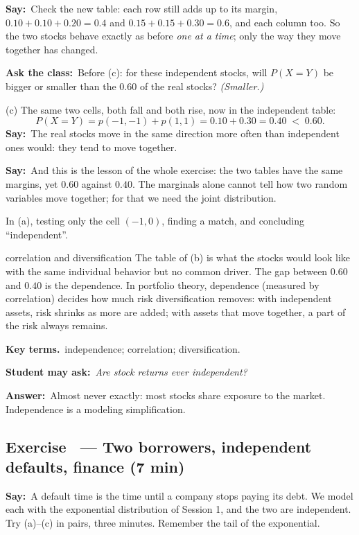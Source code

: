 \documentclass[11pt,a4paper,parskip=half]{scrartcl}
\renewcommand{\needspace}[1]{\Needspace{6\baselineskip}}
\newcommand{\terms}{\par\textbf{\color{plum}Key terms.}\ }
\newcommand{\sq}[1]{\par\textbf{\color{plum}Student may ask:}\ \emph{#1}\par}
\newcommand{\ans}{\textbf{Answer:}\ }
\newcommand{\say}{\textbf{\color{teal}Say:}\ }
\newcommand{\ask}{\textbf{\color{navy}Ask the class:}\ }
\begin{document}
\say Check the new table: each row still adds up to its margin,
$0.10+0.10+0.20=0.4$ and $0.15+0.15+0.30=0.6$, and each column too. So the
two stocks behave exactly as before \emph{one at a time}; only the way
they move together has changed.

\ask Before (c): for these independent stocks, will $P(X=Y)$ be bigger or
smaller than the $0.60$ of the real stocks? \emph{(Smaller.)}

(c) The same two cells, both fall and both rise, now in the independent
table:
\[ P(X=Y)=p(-1,-1)+p(1,1)=0.10+0.30=0.40\;<\;0.60. \]
\say The real stocks move in the same direction more often than
independent ones would: they tend to move together.

\say And this is the lesson of the whole exercise: the two tables have the
same margins, yet $0.60$ against $0.40$. The marginals alone cannot tell
how two random variables move together; for that we need the joint
distribution.

\begin{mistake}
	In (a), testing only the cell $(-1,0)$, finding a match, and concluding
	``independent''.
\end{mistake}

\begin{bg}{correlation and diversification}
	The table of (b) is what the stocks would look like with the same
	individual behavior but no common driver. The gap between $0.60$ and
	$0.40$ is the dependence. In portfolio theory, dependence (measured by
	correlation) decides how much risk diversification removes: with
	independent assets, risk shrinks as more are added; with assets that move
	together, a part of the risk always remains.

	\terms independence; correlation; diversification.

	\sq{Are stock returns ever independent?}
	\ans Almost never exactly: most stocks share exposure to the market.
	Independence is a modeling simplification.
\end{bg}

\needspace{0.25\textheight}
\subsection{Exercise~ --- Two borrowers, independent defaults, finance (7 min)}


\say A default time is the time until a company stops paying its debt. We
model each with the exponential distribution of Session 1, and the two
are independent. Try (a)--(c) in pairs, three minutes. Remember the tail
of the exponential.
\end{document}
